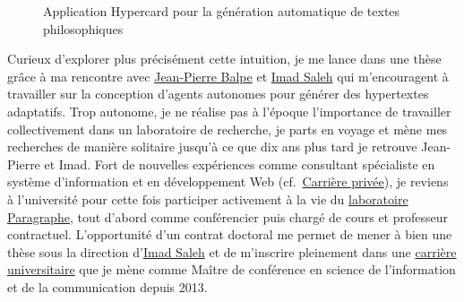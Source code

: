 \documentclass[
  a4paper,
  DIV=11,
  numbers=noendperiod]{scrreprt}
\begin{document}
\begin{figure}


\caption{\label{fig-appliHypercard}Application Hypercard pour la
génération automatique de textes philosophiques}

\end{figure}%

Curieux d'explorer plus précisément cette intuition, je me lance dans
une thèse grâce à ma rencontre avec
\href{http://localhost/samszo/omk/s/fiches/item/61153}{Jean-Pierre
Balpe} et \href{http://localhost/samszo/omk/s/fiches/item/61148}{Imad
Saleh} qui m'encouragent à travailler sur la conception d'agents
autonomes pour générer des hypertextes adaptatifs. Trop autonome, je ne
réalise pas à l'époque l'importance de travailler collectivement dans un
laboratoire de recherche, je parts en voyage et mène mes recherches de
manière solitaire jusqu'à ce que dix ans plus tard je retrouve
Jean-Pierre et Imad. Fort de nouvelles expériences comme consultant
spécialiste en système d'information et en développement Web
(cf.~\href{http://localhost/samszo/omk/s/fiches/item/300719}{Carrière
privée}), je reviens à l'université pour cette fois participer
activement à la vie du
\href{http://localhost/samszo/omk/s/fiches/item/299601}{laboratoire
Paragraphe}, tout d'abord comme conférencier puis chargé de cours et
professeur contractuel. L'opportunité d'un contrat doctoral me permet de
mener à bien une thèse sous la direction
d'\href{http://localhost/samszo/omk/s/fiches/item/61148}{Imad Saleh} et
de m'inscrire pleinement dans une
\href{http://localhost/samszo/omk/s/fiches/item/300716}{carrière
universitaire} que je mène comme Maître de conférence en science de
l'information et de la communication depuis 2013.
\end{document}
